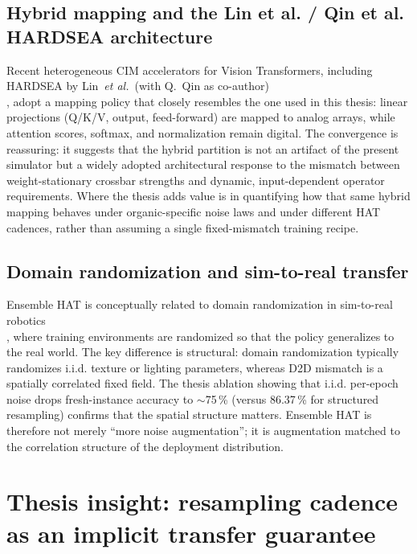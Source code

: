 \subsection{Hybrid mapping and the Lin et al. / Qin et al. HARDSEA architecture}

Recent heterogeneous CIM accelerators for Vision Transformers, including HARDSEA by Lin~\emph{et al.}~(with Q.~Qin as co-author) \\\citep{lin2024hardsea}, adopt a mapping policy that closely resembles the one used in this thesis: linear projections (Q/K/V, output, feed-forward) are mapped to analog arrays, while attention scores, softmax, and normalization remain digital. The convergence is reassuring: it suggests that the hybrid partition is not an artifact of the present simulator but a widely adopted architectural response to the mismatch between weight-stationary crossbar strengths and dynamic, input-dependent operator requirements. Where the thesis adds value is in quantifying how that same hybrid mapping behaves under organic-specific noise laws and under different HAT cadences, rather than assuming a single fixed-mismatch training recipe.

\subsection{Domain randomization and sim-to-real transfer}

Ensemble HAT is conceptually related to domain randomization in sim-to-real robotics \\\citep{tobin2017domain}, where training environments are randomized so that the policy generalizes to the real world. The key difference is structural: domain randomization typically randomizes i.i.d. texture or lighting parameters, whereas D2D mismatch is a spatially correlated fixed field. The thesis ablation showing that i.i.d. per-epoch noise drops fresh-instance accuracy to $\sim$75\,\% (versus 86.37\,\% for structured resampling) confirms that the spatial structure matters. Ensemble HAT is therefore not merely ``more noise augmentation''; it is augmentation matched to the correlation structure of the deployment distribution.

\section{Thesis insight: resampling cadence as an implicit transfer guarantee}
\label{sec:cadence-transfer-guarantee}


